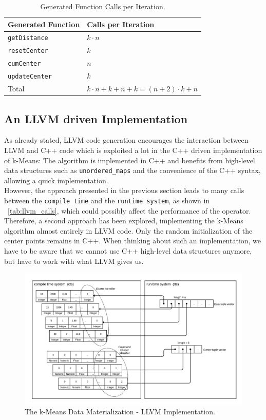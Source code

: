 \begin{table}[htsb]
  \caption[LLVM number of calls]{Generated Function Calls per Iteration.}\label{tab:llvm_calls}
  \centering
  \begin{tabular}{l l}
    \toprule
      Generated Function & Calls per Iteration \\
    \midrule
      \texttt{getDistance} & $k \cdot n$ \\
      \texttt{resetCenter} & $k$ \\
      \texttt{cumCenter} & $n$ \\
      \texttt{updateCenter} & $k$ \\
    \bottomrule
      Total & $k \cdot n + k + n + k = (n + 2) \cdot k + n$ \\
  \end{tabular}
\end{table}


\subsection{An LLVM driven Implementation}

As already stated, LLVM code generation encourages the interaction between LLVM and C++ code which is exploited a lot in the C++ driven implementation of k-Means: The algorithm is implemented in C++ and benefits from high-level data structures such as \texttt{unordered\_maps} and the convenience of the C++ syntax, allowing a quick implementation. 
\\
However, the approach presented in the previous section leads to many calls between the \texttt{compile time} and the \texttt{runtime system}, as shown in ~\autoref{tab:llvm_calls}, which could possibly affect the performance of the operator. Therefore, a second approach has been explored, implementing the k-Means algorithm almost entirely in LLVM code. Only the random initialization of the center points remains in C++. When thinking about such an implementation, we have to be aware that we cannot use C++ high-level data structures anymore, but have to work with what LLVM gives us.


\begin{figure}[htsb]
  \centerline{
    \includegraphics[scale=0.4]{figures/mat4_font}
  }
  \caption[The k-Means Data Materialization - LLVM Implementation]{The k-Means Data Materialization - LLVM Implementation.}
  \label{fig:mat4}
\end{figure}

